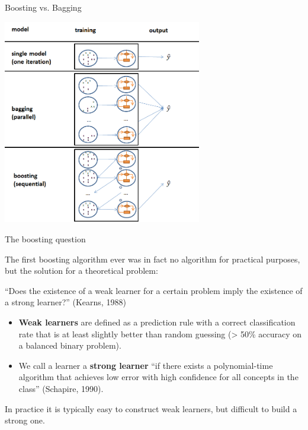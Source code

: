 \begin{vbframe}{Boosting vs. Bagging}

\begin{center}
\includegraphics[width=0.65\textwidth]{figure_man/bagging_vs_boosting.png}
\end{center}


\end{vbframe}

\begin{vbframe}{The boosting question}

The first boosting algorithm ever was in fact no algorithm for practical purposes, but the solution for a theoretical problem:

\lz

\enquote{Does the existence of a weak learner for a certain problem imply
the existence of a strong learner?} (Kearns, 1988)

\lz

\begin{itemize}
\item \textbf{Weak learners} are defined as a prediction rule with a correct classification rate that is at least slightly better than random guessing (> 50\% accuracy on a balanced binary problem).
\item We call a learner a \textbf{strong learner} \enquote{if there exists a polynomial-time algorithm that achieves low error with high confidence for all concepts in the class} (Schapire, 1990).

\end{itemize}

In practice it is typically easy to construct weak learners, but difficult to build a strong one.

\end{vbframe}

